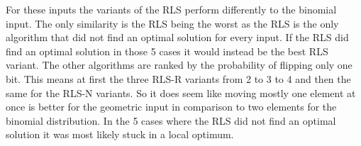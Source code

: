 For these inputs the variants of the RLS perform differently to the binomial input.
The only similarity is the RLS being the worst as the RLS is the only algorithm that did not find an optimal solution for every input.
If the RLS did find an optimal solution in those 5 cases it would instead be the best RLS variant.
The other algorithms are ranked by the probability of flipping only one bit.
This means at first the three RLS-R variants from 2 to 3 to 4 and then the same for the RLS-N variants.
So it does seem like moving mostly one element at once is better for the geometric input in comparison to two elements for the binomial distribution.
In the 5 cases where the RLS did not find an optimal solution it was most likely stuck in a local optimum.
